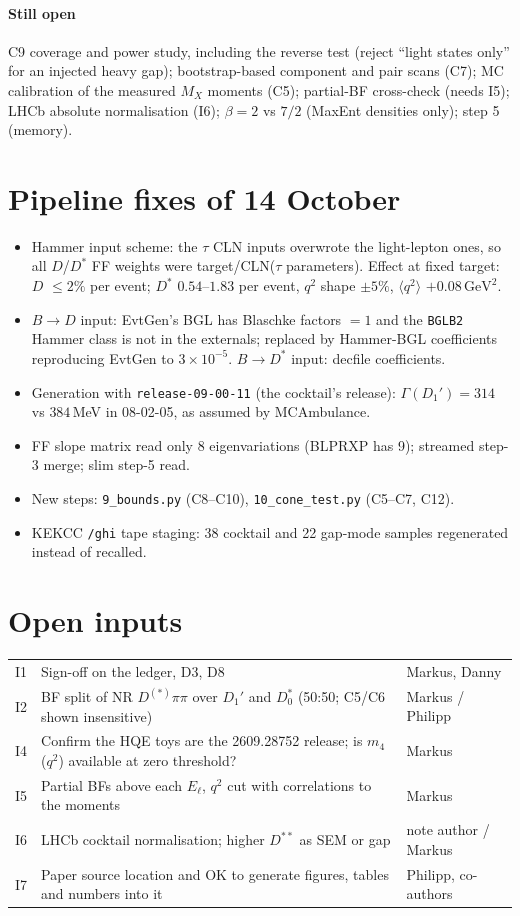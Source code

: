 \documentclass[11pt]{article}
\newcommand{\GeV}{\,\mathrm{GeV}}
\begin{document}
\paragraph{Still open}
C9 coverage and power study, including the reverse test (reject ``light states only'' for an injected heavy gap);
bootstrap-based component and pair scans (C7); MC calibration of the measured $M_X$ moments (C5); partial-BF cross-check
(needs I5); LHCb absolute normalisation (I6); $\beta=2$ vs $7/2$ (MaxEnt densities only); step 5 (memory).

\section{Pipeline fixes of 14 October}\label{sec:fixes}
\begin{itemize}
\item Hammer input scheme: the $\tau$ CLN inputs overwrote the light-lepton ones, so all $D$/$D^*$ FF weights were
  target/CLN($\tau$ parameters). Effect at fixed target: $D$ $\le2\%$ per event; $D^*$ $0.54$--$1.83$ per event,
  $q^2$ shape $\pm5\%$, $\langle q^2\rangle$ $+0.08\GeV^2$.
\item $B\to D$ input: EvtGen's BGL has Blaschke factors $=1$ and the \texttt{BGLB2} Hammer class is not in the externals;
  replaced by Hammer-BGL coefficients reproducing EvtGen to $3\times10^{-5}$. $B\to D^*$ input: decfile coefficients.
\item Generation with \texttt{release-09-00-11} (the cocktail's release): $\Gamma(D_1') = 314$ vs $384\,$MeV in 08-02-05,
  as assumed by MCAmbulance.
\item FF slope matrix read only 8 eigenvariations (BLPRXP has 9); streamed step-3 merge; slim step-5 read.
\item New steps: \texttt{9\_bounds.py} (C8--C10), \texttt{10\_cone\_test.py} (C5--C7, C12).
\item KEKCC \texttt{/ghi} tape staging: 38 cocktail and 22 gap-mode samples regenerated instead of recalled.
\end{itemize}

\section{Open inputs}
\begin{tabular}{@{}p{0.6cm}p{11.5cm}>{\raggedright\arraybackslash}p{3.3cm}@{}}
\toprule
I1 & Sign-off on the ledger, D3, D8 & Markus, Danny \\
I2 & BF split of NR $D^{(*)}\pi\pi$ over $D_1'$ and $D_0^*$ (50:50; C5/C6 shown insensitive) & Markus / Philipp \\
I4 & Confirm the HQE toys are the 2609.28752 release; is $m_4$ ($q^2$) available at zero threshold? & Markus \\
I5 & Partial BFs above each $E_\ell$, $q^2$ cut with correlations to the moments & Markus \\
I6 & LHCb cocktail normalisation; higher $D^{**}$ as SEM or gap & note author / Markus \\
I7 & Paper source location and OK to generate figures, tables and numbers into it & Philipp, co-authors \\
\bottomrule
\end{tabular}
\end{document}
